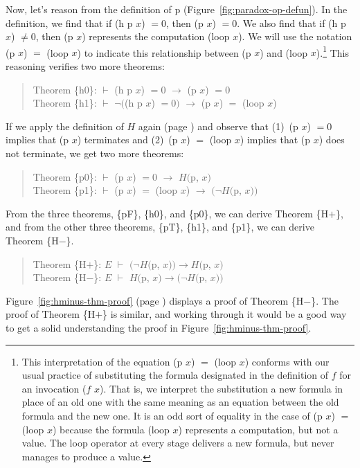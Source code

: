 Now, let's reason from the definition of p (Figure~\ref{fig:paradox-op-defun}).
In the definition, we find that if (h p $x$) $= 0$, then (p $x$) $=0 $.
We also find that if (h p $x$) $\neq 0$, then (p $x$) represents
the computation (loop $x$). We will use the notation (p $x$) $=$ (loop $x$)
to indicate this relationship between (p $x$) and (loop $x$).\footnote{This
\label{caveat:equality-for-loop}
interpretation of the equation (p $x$) $=$ (loop $x$) conforms with
our usual practice of substituting the formula designated in the
definition of $f$ for an invocation ($f$ $x$).
That is, we interpret the substitution a new formula
in place of an old one with the same meaning as an equation
between the old formula and the new one.
It is an odd sort of equality in the case of (p $x$) $=$ (loop $x$)
because the formula (loop $x$) represents a computation, but not a value.
The loop operator at every stage delivers a new formula,
but never manages to produce a value.}
This reasoning verifies two more theorems:
\begin{quote}
Theorem \{h0\}: $\vdash$  (h p $x$) $=0$  $\rightarrow$ (p $x$) $= 0$    \\
Theorem \{h1\}: $\vdash$  $\neg($(h p $x$) $= 0)$ $\rightarrow$ (p $x$) $=$ (loop $x$)
\end{quote}

If we apply the definition of $H$ again (page \pageref{def:predicate-H})
and observe that (1)~(p $x$) $= 0$ implies that (p $x$) terminates and
(2)~(p $x$) $=$ (loop $x$) implies that (p $x$) does not terminate,
we get two more theorems:
\begin{quote}
Theorem \{p0\}: $\vdash$  (p $x$) $= 0$ $\rightarrow$ $H($p, $x)$ \\
Theorem \{p1\}: $\vdash$  (p $x$) $=$ (loop $x$) $\rightarrow$ $(\neg H($p, $x))$
\end{quote}

From the three theorems, \{pF\}, \{h0\}, and \{p0\},
we can derive Theorem \{H$+$\}, and
from the other three theorems, \{pT\}, \{h1\}, and \{p1\},
we can derive Theorem \{H$-$\}.
\begin{quote}
Theorem \{H$+$\}: $E$ $\vdash$ $(\neg H($p, $x))\rightarrow H($p, $x)$ \\
Theorem \{H$-$\}: $E$ $\vdash$ $H($p, $x) \rightarrow(\neg H($p, $x))$
\end{quote}

Figure~\ref{fig:hminus-thm-proof} (page \pageref{fig:hminus-thm-proof}) displays
a proof of Theorem \{H$-$\}.
The proof of Theorem \{H$+$\} is similar, and working through it would be
a good way to get a solid understanding the proof in Figure~\ref{fig:hminus-thm-proof}.

